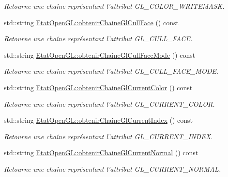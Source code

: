 \begin{DoxyCompactItemize}
\begin{DoxyCompactList}\small\item\em Retourne une chaîne représentant l'attribut G\-L\-\_\-\-C\-O\-L\-O\-R\-\_\-\-W\-R\-I\-T\-E\-M\-A\-S\-K. \end{DoxyCompactList}\item 
std\-::string \hyperlink{group__utilitaire_ga6c53044cfb9b67582efe6415ff1f1f49}{Etat\-Open\-G\-L\-::obtenir\-Chaine\-Gl\-Cull\-Face} () const 
\begin{DoxyCompactList}\small\item\em Retourne une chaîne représentant l'attribut G\-L\-\_\-\-C\-U\-L\-L\-\_\-\-F\-A\-C\-E. \end{DoxyCompactList}\item 
std\-::string \hyperlink{group__utilitaire_ga0601a9f84791de8e9ab33841308ecea0}{Etat\-Open\-G\-L\-::obtenir\-Chaine\-Gl\-Cull\-Face\-Mode} () const 
\begin{DoxyCompactList}\small\item\em Retourne une chaîne représentant l'attribut G\-L\-\_\-\-C\-U\-L\-L\-\_\-\-F\-A\-C\-E\-\_\-\-M\-O\-D\-E. \end{DoxyCompactList}\item 
std\-::string \hyperlink{group__utilitaire_gabe349174d65850291bc46f7b524dac44}{Etat\-Open\-G\-L\-::obtenir\-Chaine\-Gl\-Current\-Color} () const 
\begin{DoxyCompactList}\small\item\em Retourne une chaîne représentant l'attribut G\-L\-\_\-\-C\-U\-R\-R\-E\-N\-T\-\_\-\-C\-O\-L\-O\-R. \end{DoxyCompactList}\item 
std\-::string \hyperlink{group__utilitaire_ga222790a07e4a9cacfbe2f68cd97fd8d9}{Etat\-Open\-G\-L\-::obtenir\-Chaine\-Gl\-Current\-Index} () const 
\begin{DoxyCompactList}\small\item\em Retourne une chaîne représentant l'attribut G\-L\-\_\-\-C\-U\-R\-R\-E\-N\-T\-\_\-\-I\-N\-D\-E\-X. \end{DoxyCompactList}\item 
std\-::string \hyperlink{group__utilitaire_gac6c54789d936998634ad29c80e150d92}{Etat\-Open\-G\-L\-::obtenir\-Chaine\-Gl\-Current\-Normal} () const 
\begin{DoxyCompactList}\small\item\em Retourne une chaîne représentant l'attribut G\-L\-\_\-\-C\-U\-R\-R\-E\-N\-T\-\_\-\-N\-O\-R\-M\-A\-L. \end{DoxyCompactList}\item 

\end{DoxyCompactItemize}

